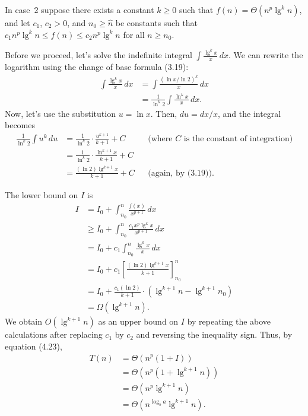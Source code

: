 In case~2 suppose there exists a constant $k\ge0$ such that $f(n)=\Theta(n^p\lg^kn)$, and let $c_1$, $c_2>0$, and $n_0\ge\widehat{n}$ be constants such that $c_1n^p\lg^kn\le f(n)\le c_2n^p\lg^kn$ for all $n\ge n_0$.

Before we proceed, let's solve the indefinite integral $\int\frac{\lg^kx}{x}\,dx$.
We can rewrite the logarithm using the change of base formula (3.19):
\begin{align*}
    \int\frac{\lg^kx}{x}\,dx &= \int\frac{(\ln x/\ln2)^k}{x}\,dx \\
    &= \frac{1}{\ln^k2}\int\frac{\ln^kx}{x}\,dx.
\end{align*}
Now, let's use the substitution $u=\ln x$.
Then, $du=dx/x$, and the integral becomes
\begin{align*}
    \frac{1}{\ln^k2}\int u^k\,du &= \frac{1}{\ln^k2}\cdot\frac{u^{k+1}}{k+1}+C && \text{(where $C$ is the constant of integration)} \\[1mm]
    &= \frac{1}{\ln^k2}\cdot\frac{\ln^{k+1}x}{k+1}+C \\[1mm]
    &= \frac{(\ln2)\lg^{k+1}x}{k+1}+C && \text{(again, by (3.19))}.
\end{align*}

The lower bound on $I$ is
\begin{align*}
    I &= I_0+\int_{n_0}^n\frac{f(x)}{x^{p+1}}\,dx \\[1mm]
    &\ge I_0+\int_{n_0}^n\frac{c_1x^p\lg^kx}{x^{p+1}}\,dx \\[1mm]
    &= I_0+c_1\int_{n_0}^n\frac{\lg^kx}{x}\,dx \\[1mm]
    &= I_0+c_1\left[\frac{(\ln2)\lg^{k+1}x}{k+1}\right]_{n_0}^n \\[1mm]
    &= I_0+\frac{c_1(\ln2)}{k+1}\cdot(\lg^{k+1}n-\lg^{k+1}n_0) \\[1mm]
    &= \Omega(\lg^{k+1}n).
\end{align*}
We obtain $O(\lg^{k+1}n)$ as an upper bound on $I$ by repeating the above calculations after replacing $c_1$ by $c_2$ and reversing the inequality sign.
Thus, by equation (4.23),
\begin{align*}
    T(n) &= \Theta(n^p(1+I)) \\
    &= \Theta(n^p(1+\lg^{k+1}n)) \\
    &= \Theta(n^p\lg^{k+1}n) \\
    &= \Theta(n^{\log_ba}\lg^{k+1}n).
\end{align*}

